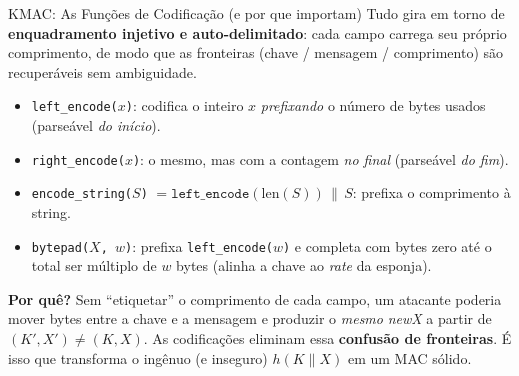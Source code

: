 \documentclass{beamer}
\begin{document}
\begin{frame}{KMAC: As Funções de Codificação (e por que importam)}
    Tudo gira em torno de \textbf{enquadramento injetivo e auto-delimitado}: cada campo carrega seu próprio comprimento, de modo que as fronteiras (chave / mensagem / comprimento) são recuperáveis sem ambiguidade.
    \medskip
    \begin{itemize}
        \footnotesize
        \item \texttt{left\_encode($x$)}: codifica o inteiro $x$ \emph{prefixando} o número de bytes usados (parseável \emph{do início}).
        \item \texttt{right\_encode($x$)}: o mesmo, mas com a contagem \emph{no final} (parseável \emph{do fim}).
        \item \texttt{encode\_string($S$)} $= \texttt{left\_encode}(\text{len}(S)) \,\|\, S$: prefixa o comprimento à string.
        \item \texttt{bytepad($X$, $w$)}: prefixa \texttt{left\_encode($w$)} e completa com bytes zero até o total ser múltiplo de $w$ bytes (alinha a chave ao \emph{rate} da esponja).
    \end{itemize}
    \medskip
    \begin{tcolorbox}[colback=blue!5,colframe=blue!50!black,boxrule=0.5pt]
        \footnotesize
        \textbf{Por quê?} Sem ``etiquetar'' o comprimento de cada campo, um atacante poderia mover bytes entre a chave e a mensagem e produzir o \emph{mesmo} \textit{newX} a partir de $(K', X') \neq (K, X)$. As codificações eliminam essa \textbf{confusão de fronteiras}. É isso que transforma o ingênuo (e inseguro) $h(K\|X)$ em um MAC sólido.
    \end{tcolorbox}
\end{frame}
\end{document}
